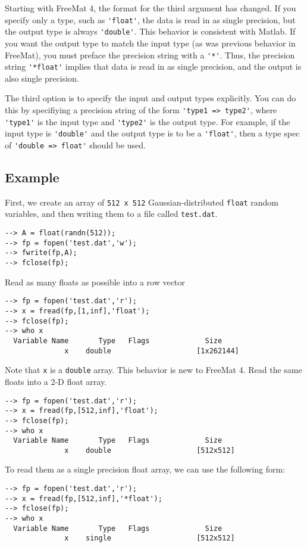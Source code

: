 Starting with FreeMat 4, the format for the third argument has changed.
If you specify only a type, such as \verb|'float'|, the data is read in as
single precision, but the output type is always \verb|'double'|.  This behavior
is consistent with Matlab.  If you want the output type to match the input
type (as was previous behavior in FreeMat), you must preface the precision
string with a \verb|'*'|.  Thus, the precision string \verb|'*float'| implies
that data is read in as single precision, and the output is also single
precision.

The third option is to specify the input and output types explicitly.
You can do this by specifiying a precision string of the form 
\verb|'type1 => type2'|, where \verb|'type1'| is the input type and 
\verb|'type2'| is the output type.  For example, if the input type is
\verb|'double'| and the output type is to be a \verb|'float'|, then a type spec
of \verb|'double => float'| should be used.

\subsection{Example}

First, we create an array of \verb|512 x 512| Gaussian-distributed \verb|float| random variables, and then writing them to a file called \verb|test.dat|.
\begin{verbatim}
--> A = float(randn(512));
--> fp = fopen('test.dat','w');
--> fwrite(fp,A);
--> fclose(fp);
\end{verbatim}
Read as many floats as possible into a row vector
\begin{verbatim}
--> fp = fopen('test.dat','r');
--> x = fread(fp,[1,inf],'float');
--> fclose(fp);
--> who x
  Variable Name       Type   Flags             Size
              x    double                    [1x262144]
\end{verbatim}
Note that \verb|x| is a \verb|double| array.  This behavior is new to FreeMat 4.
Read the same floats into a 2-D float array.
\begin{verbatim}
--> fp = fopen('test.dat','r');
--> x = fread(fp,[512,inf],'float');
--> fclose(fp);
--> who x
  Variable Name       Type   Flags             Size
              x    double                    [512x512]
\end{verbatim}
To read them as a single precision float array, we can use the
following form:
\begin{verbatim}
--> fp = fopen('test.dat','r');
--> x = fread(fp,[512,inf],'*float');
--> fclose(fp);
--> who x
  Variable Name       Type   Flags             Size
              x    single                    [512x512]
\end{verbatim}

